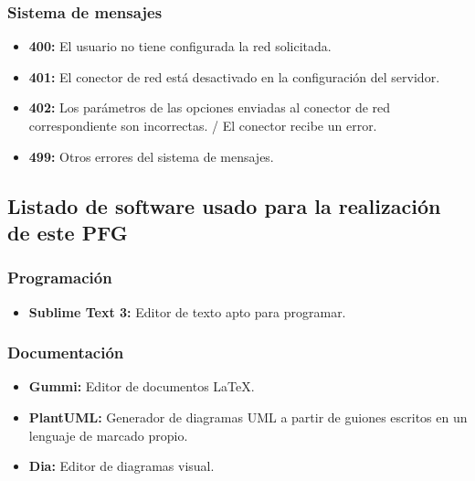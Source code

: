\documentclass[spanish,12pt, a4paper, twoside]{paper}
\begin{document}
\subsubsection*{Sistema de mensajes}

\begin{itemize}
\item\textbf{400:} El usuario no tiene configurada la red solicitada.
\item\textbf{401:} El conector de red está desactivado en la configuración del servidor.
\item\textbf{402:} Los parámetros de las opciones enviadas al conector de red correspondiente son incorrectas. / El conector recibe un error.
\item\textbf{499:} Otros errores del sistema de mensajes.
\end{itemize}

\subsection*{Listado de software usado para la realización de este PFG}

\subsubsection*{Programación}

\begin{itemize}
\item\textbf{Sublime Text 3:} Editor de texto apto para programar.
\end{itemize}

\subsubsection*{Documentación}

\begin{itemize}
\item\textbf{Gummi:} Editor de documentos \LaTeX.
\item\textbf{PlantUML:} Generador de diagramas UML a partir de guiones escritos en un lenguaje de marcado propio.
\item\textbf{Dia:} Editor de diagramas visual.
\end{itemize}

\newpage
\end{document}
